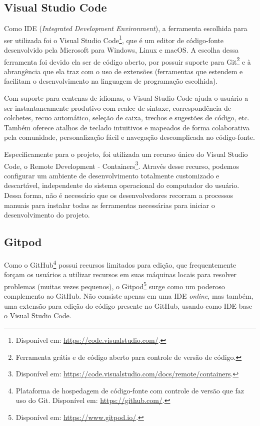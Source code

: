 \subsection{Visual Studio Code}
\label{ssec:VSCode}
Como IDE (\textit{Integrated Development Environment}), a ferramenta escolhida para ser utilizada foi o Visual Studio Code\footnote{Disponível em: \url{https://code.visualstudio.com/}.}, que é um editor de código-fonte desenvolvido pela Microsoft para Windows, Linux e macOS. A escolha dessa ferramenta foi devido ela ser de código aberto, por possuir suporte para Git\footnote{Ferramenta grátis e de código aberto para controle de versão de código.} e à abrangência que ela traz com o uso de extensões (ferramentas que estendem e facilitam o desenvolvimento na linguagem de programação escolhida).

Com suporte para centenas de idiomas, o Visual Studio Code ajuda o usuário a ser instantaneamente produtivo com realce de sintaxe, correspondência de colchetes, recuo automático, seleção de caixa, trechos e sugestões de código, etc. Também oferece atalhos de teclado intuitivos e mapeados de forma colaborativa pela comunidade, personalização fácil e navegação descomplicada no código-fonte. \cite{microsoft2020VSCode}

Especificamente para o projeto, foi utilizada um recurso único do Visual Studio Code, o Remote Development - Containers\footnote{Disponível em: \url{https://code.visualstudio.com/docs/remote/containers}.}. Através desse recurso, podemos configurar um ambiente de desenvolvimento totalmente customizado e descartável, independente do sistema operacional do computador do usuário. Dessa forma, não é necessário que os desenvolvedores recorram a processos manuais para instalar todas as ferramentas necessárias para iniciar o desenvolvimento do projeto.

\subsection{Gitpod}
\label{ssec:Gitpod}
Como o GitHub\footnote{Plataforma de hospedagem de código-fonte com controle de versão que faz uso do Git. Disponível em: \url{https://github.com/}.} possui recursos limitados para edição, que frequentemente forçam os usuários a utilizar recursos em suas máquinas locais para resolver problemas (muitas vezes pequenos), o Gitpod\footnote{Disponível em: \url{https://www.gitpod.io/}.} surge como um poderoso complemento ao GitHub. Não consiste apenas em uma IDE \textit{online}, mas também, uma extensão para edição do código presente no GitHub, usando como IDE base o Visual Studio Code.

